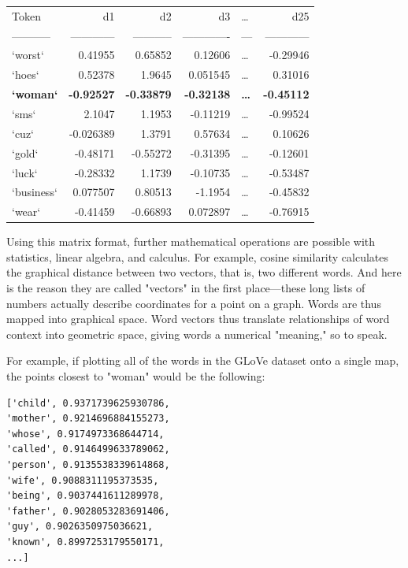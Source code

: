 \documentclass[11pt]{article}
\begin{document}
\begin{center}
\begin{tabular}{lrrrlr}
Token & d1 & d2 & d3 & … & d25\\[0pt]
----------- & ------------ & ----------- & ------------- & --- & ------------\\[0pt]
`worst` & 0.41955 & 0.65852 & 0.12606 & … & -0.29946\\[0pt]
`hoes` & 0.52378 & 1.9645 & 0.051545 & … & 0.31016\\[0pt]
\textbf{\textbf{`woman`}} & \textbf{\textbf{-0.92527}} & \textbf{\textbf{-0.33879}} & \textbf{\textbf{-0.32138}} & \textbf{\textbf{…}} & \textbf{\textbf{-0.45112}}\\[0pt]
`sms` & 2.1047 & 1.1953 & -0.11219 & … & -0.99524\\[0pt]
`cuz` & -0.026389 & 1.3791 & 0.57634 & … & 0.10626\\[0pt]
`gold` & -0.48171 & -0.55272 & -0.31395 & … & -0.12601\\[0pt]
`luck` & -0.28332 & 1.1739 & -0.10735 & … & -0.53487\\[0pt]
`business` & 0.077507 & 0.80513 & -1.1954 & … & -0.45832\\[0pt]
`wear` & -0.41459 & -0.66893 & 0.072897 & … & -0.76915\\[0pt]
\end{tabular}
\end{center}


Using this matrix format, further mathematical operations are possible
with statistics, linear algebra, and calculus. For example, cosine
similarity calculates the graphical distance between two vectors, that
is, two different words. And here is the reason they are called
"vectors" in the first place---these long lists of numbers actually
describe coordinates for a point on a graph. Words are thus mapped
into graphical space. Word vectors thus translate relationships of
word context into geometric space, giving words a numerical "meaning,"
so to speak.

For example, if plotting all of the words in the GLoVe dataset onto a
single map, the points closest to "woman" would be the following:

\begin{verbatim}
['child', 0.9371739625930786, 
'mother', 0.9214696884155273, 
'whose', 0.9174973368644714, 
'called', 0.9146499633789062, 
'person', 0.9135538339614868, 
'wife', 0.9088311195373535, 
'being', 0.9037441611289978, 
'father', 0.9028053283691406, 
'guy', 0.9026350975036621, 
'known', 0.8997253179550171,
...]  
\end{verbatim}
\end{document}
